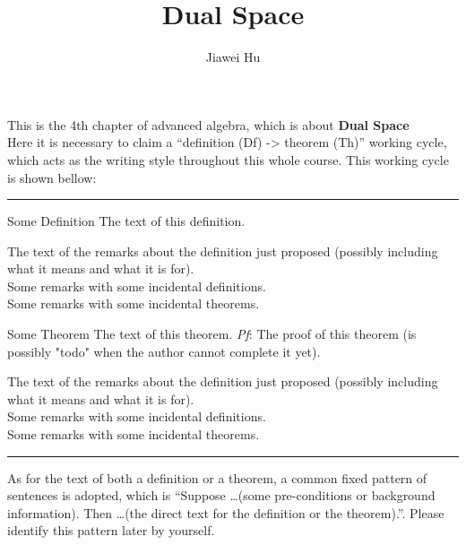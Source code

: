 \documentclass{article}
\title{\LARGE \textbf{Dual Space}}
\author{\large Jiawei Hu}
\begin{document}
\maketitle

This is the 4th chapter of advanced algebra, which is about \textbf{Dual Space}\\
Here it is necessary to claim a ``definition (Df) -> theorem (Th)'' working cycle, which acts as the writing style throughout this whole course. This working cycle is shown bellow:

\noindent\rule{\textwidth}{2pt}
\begin{Df}{Some Definition}
    The text of this definition.
\end{Df}

\begin{Rmk}{}
    The text of the remarks about the definition just proposed (possibly including what it means and what it is for).\\
    \textcolor{Df}{Some remarks with some incidental definitions.}\\
    \textcolor{Th}{Some remarks with some incidental theorems.}
\end{Rmk}

\begin{Th}{Some Theorem}
    The text of this theorem.
    \tcblower
    \textit{Pf}: The proof of this theorem (is possibly "todo" when the author cannot complete it yet).
\end{Th}

\begin{Rmk}{}
    The text of the remarks about the definition just proposed (possibly including what it means and what it is for).\\
    \textcolor{Df}{Some remarks with some incidental definitions.}\\
    \textcolor{Th}{Some remarks with some incidental theorems.}
\end{Rmk}
\noindent\rule{\textwidth}{2pt}
As for the text of both a definition or a theorem, a common fixed pattern of sentences is adopted, which is ``Suppose \dots (some pre-conditions or background information). Then \dots (the direct text for the definition or the theorem).''. Please identify this pattern later by yourself. 
\end{document}
